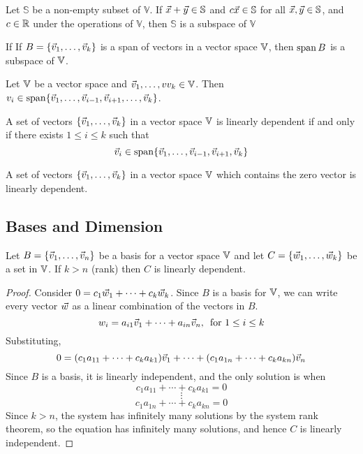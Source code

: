 \documentclass[english,12pt]{article}
\begin{document}
\begin{thrm}
Let $\mathbb{S}$ be a non-empty subset of $\mathbb{V}$. If $\vec{x} + \vec{y} \in \mathbb{S}$ and $c\vec{x} \in \mathbb{S}$ for all $\vec{x},\vec{y} \in \mathbb{S}$, and $c \in {\mathbb{R}}$ under the operations of $\mathbb{V}$, then $\mathbb{S}$ is a subspace of $\mathbb{V}$
\end{thrm}

\begin{thrm}
If
If $B = \{\vec{v}_1,\dots,\vec{v}_k\}$ is a span of vectors in a vector space ${\mathbb{V}}$, then $\operatorname{span} B$ is a subspace of ${\mathbb{V}}$.
\end{thrm}

\begin{thrm}
Let ${\mathbb{V}}$ be a vector space and $\vec{v}_1,\dots,vv_k \in {\mathbb{V}}$. Then $v_i \in \operatorname{span} \{\vec{v}_1,\dots,\vec{v}_{i-1},\vec{v}_{i+1},\dots,\vec{v}_k\}$.
\end{thrm}

\begin{thrm}
A set of vectors $\{\vec{v}_1,\dots,\vec{v}_k\}$ in a vector space ${\mathbb{V}}$ is linearly dependent if and only if there exists $1 \leq i \leq k$ such that
\[\vec{v}_i \in \operatorname{span} \{\vec{v}_1,\dots,\vec{v}_{i-1},\vec{v}_{i+1},\vec{v}_k\}\]
\end{thrm}

\begin{thrm}
A set of vectors $\{\vec{v}_1,\dots,\vec{v}_k\}$ in a vector space ${\mathbb{V}}$ which contains the zero vector is linearly dependent.
\end{thrm}

\subsection{Bases and Dimension}

\begin{thrm}
Let $B = \{\vec{v}_1,\dots,\vec{v}_n\}$ be a basis for a vector space ${\mathbb{V}}$ and let $C = \{\vec{w}_1,\dots,\vec{w}_k\}$ be a set in ${\mathbb{V}}$. If $k > n$ (rank) then $C$ is linearly dependent.

\begin{proof}
Consider $0 = c_1\vec{w}_1 + \cdots + c_k \vec{w}_k$. \n
Since $B$ is a basis for ${\mathbb{V}}$, we can write every vector $\vec{w}$ as a linear combination of the vectors in $B$.
\[w_i = a_{i1}\vec{v}_1 + \cdots + a_{in} \vec{v}_n,\, \text{ for } 1 \leq i \leq k\]
Substituting,
\[ 0 = (c_1  a_{11} + \cdots + c_k a_{k1})\vec{v}_1 + \cdots + (c_1 a_{1n} + \cdots + c_k a_{kn}) \vec{v}_n\]
Since $B$ is a basis, it is linearly independent, and the only solution is when
\[c_1 a_{11} + \cdots + c_k a_{k1} = 0\]
\[\vdots\]
\[c_1 a_{1n} + \cdots + c_k a_{kn} = 0\]
Since $k > n$, the system has infinitely many solutions by the system rank theorem, so the equation has infinitely many solutions, and hence $C$ is linearly independent.
\end{proof}
\end{thrm}
\end{document}
